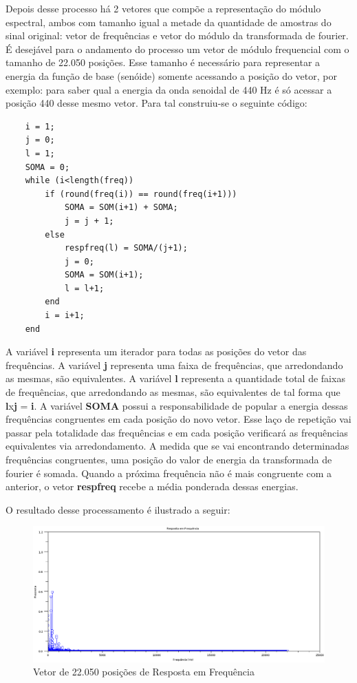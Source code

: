 Depois desse processo há 2 vetores que compõe a representação do módulo espectral, ambos com tamanho igual a metade da quantidade de amostras do sinal original: vetor de frequências e vetor do módulo da transformada de fourier. É desejável para o andamento do processo um vetor de módulo frequencial com o tamanho de 22.050 posições. Esse tamanho é necessário para representar a energia da função de base (senóide) somente acessando a posição do vetor, por exemplo: para saber qual a energia da onda senoidal de 440 Hz é só acessar a posição 440 desse mesmo vetor. Para tal construiu-se o seguinte código:      
\begin{lstlisting} 
	i = 1;
	j = 0;
	l = 1;
	SOMA = 0; 
	while (i<length(freq))
    	if (round(freq(i)) == round(freq(i+1)))
        	SOMA = SOM(i+1) + SOMA;
        	j = j + 1;
   	 	else
        	respfreq(l) = SOMA/(j+1);
        	j = 0;
        	SOMA = SOM(i+1);
        	l = l+1;
    	end
    	i = i+1;
	end
\end{lstlisting}

A variável \textbf{i} representa um iterador para todas as posições do vetor das frequências. A variável \textbf{j} representa uma faixa de frequências, que arredondando as mesmas, são equivalentes. A variável \textbf{l} representa a quantidade total de faixas de frequências, que arredondando as mesmas, são equivalentes de tal forma que \textbf{l}x\textbf{j} = \textbf{i}. A variável \textbf{SOMA} possui a responsabilidade de popular a energia dessas frequências congruentes em cada posição do novo vetor. Esse laço de repetição vai passar pela totalidade das frequências e em cada posição verificará as frequências equivalentes via arredondamento. A medida que se vai encontrando determinadas frequências congruentes, uma posição do valor de energia da transformada de fourier é somada. Quando a próxima frequência não é mais congruente com a anterior, o vetor \textbf{respfreq} recebe a média ponderada dessas energias.

O resultado desse processamento é ilustrado a seguir:

\begin{figure}[h]
	\centering
		\includegraphics[keepaspectratio=true,scale=0.45]{figuras/fft-resultado}
	\caption{Vetor de 22.050 posições de Resposta em Frequência}
\end{figure}

